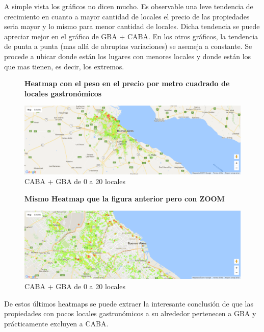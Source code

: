 \documentclass[a4paper, 10pt]{article}
\begin{document}
				
				A simple vista los gráficos no dicen mucho. Es observable una leve tendencia de 
				crecimiento en cuanto a mayor cantidad de locales el precio de las propiedades 
				seria mayor y lo mismo para menor cantidad de locales. Dicha tendencia se puede 
				apreciar mejor en el gráfico de GBA + CABA. En los otros gráficos, la tendencia 
				de punta a punta (mas allá de abruptas variaciones) se asemeja a constante.  
				Se procede a ubicar donde están los lugares con menores locales y donde están 
				los que mas tienen, es decir, los extremos.
				
				\begin{figure}[H][H]
    				\centering
    				\textbf{Heatmap con el peso en el precio por metro cuadrado de locales gastronómicos}\par\medskip
    				\includegraphics[width=\textwidth]{images/20}
    				\caption{CABA + GBA de 0 a 20 locales}
				\end{figure}				
				\begin{figure}[H][H]
    				\centering
    				\textbf{Mismo Heatmap que la figura anterior pero con ZOOM}\par\medskip
    				\includegraphics[width=\textwidth]{images/21}
    				\caption{CABA + GBA de 0 a 20 locales}
				\end{figure}
								
				
				De estos últimos heatmaps se puede extraer la interesante conclusión de que 
				las propiedades con pocos locales gastronómicos a su alrededor pertenecen a 
				GBA y prácticamente excluyen a CABA.				
								
\end{document}
